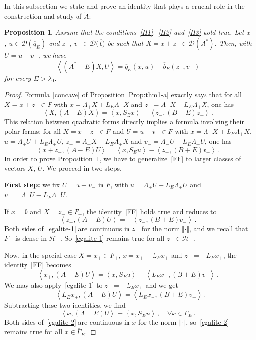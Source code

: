 \documentclass[12pt,reqno]{amsart}
\newtheorem{proposition}[theorem]{Proposition}
\newcommand{\innerproduct}[2]{\left\langle #1, #2 \right\rangle}
\newcommand{\be}[1]{\begin{equation}\label{#1}}
\newcommand{\ee}{\end{equation}}
\renewcommand{\(}{\left(}
\renewcommand{\)}{\right)}
\begin{document}
In this subsection we state and prove an identity that plays a crucial role in the construction and study of $\widetilde A$:
\begin{proposition}\label{Prop:formulaoperator}
Assume that the conditions~\eqref{H1},~\eqref{H2} and~\eqref{H3} hold true. Let $x$, $u\in \mathcal D(\overline{q}_E)$ and $z_-$, $v_-\in \mathcal D\big(\,\overline{b}\big)$ be such that $X=x+z_-\in \mathcal D\(A^*\)$. Then, with $U=u+v_-$, we have
\be{egalite-operator}
\innerproduct{(A^*-E)X}{U}= \overline q_E(x,u)-\overline b_E(z_-, v_-)
\ee
for every $E>\lambda_0$.
\end{proposition}
\begin{proof}
Formula~\eqref{concave} of Proposition \ref{Prop:thm1-a} exactly says that for all $X=x+z_-\in F$ with $x=\Lambda_+ X + L_E\Lambda_+ X$ and $z_-=\Lambda_-X-L_E\Lambda_+ X$, one has
$$\innerproduct{X}{(A-E)X}= \innerproduct{x}{S_E x}-\innerproduct{z_-}{(B+E)z_-}\,.$$
This relation between quadratic forms directly implies a formula involving their polar forms: for all $X=x+z_-\in F$ and $U=u+v_-\in F$ with $x=\Lambda_+ X + L_E\Lambda_+ X$, $u=\Lambda_+ U + L_E\Lambda_+ U$, $z_-=\Lambda_-X-L_E\Lambda_+ X$ and $v_-=\Lambda_-U-L_E\Lambda_+ U$, one has
\be{FF}\innerproduct{x+z_-}{(A-E)U}= \innerproduct{x}{S_E u}-\innerproduct{z_-}{(B+E)v_-}\,.\ee
In order to prove Proposition~\ref{Prop:formulaoperator}, we have to generalize~\eqref{FF} to larger classes of vectors $X,\,U$. We proceed in two steps.\medskip

\noindent
{\bf First step:} we fix $U=u+v_-$ in $F$, with $u=\Lambda_+ U + L_E\Lambda_+ U$ and $v_-=\Lambda_-U-L_E\Lambda_+ U$.\smallskip
 
\noindent
If $x=0$ and $X=z_-\in F_-$, the identity~\eqref{FF} holds true and reduces to
\be{egalite-1}
\innerproduct{z_-}{(A-E)U}= -\innerproduct{z_-}{(B+E)v_-}\,.
\ee
Both sides of~\eqref{egalite-1} are continuous in $z_-$ for the norm $\Vert \cdot\Vert$,
and we recall that $F_-$ is dense in $\mathcal H_-$. So~\eqref{egalite-1} remains true for all $z_-\in \mathcal H_-$.\smallskip

\noindent Now, in the special case $X=x_+\in F_+$, $x=x_++L_Ex_+$ and $z_-=-L_Ex_+$, the identity~\eqref{FF} becomes
\[ \innerproduct{x_+}{(A-E)U}= \innerproduct{x}{S_E u}+\innerproduct{L_Ex_+}{(B+E)v_-}\,.\]
We may also apply~\eqref{egalite-1} to $z_-=-L_E x_+$ and we get
\[ -\innerproduct{L_Ex_+}{(A-E)U}= \innerproduct{L_Ex_+}{(B+E)v_-}\,.\]
Subtracting these two identities, we find
\be{egalite-2}
\innerproduct{x}{(A-E)U}= \innerproduct{x}{S_E u}\,,\quad\forall x\in\Gamma_E\,.
\ee
Both sides of~\eqref{egalite-2} are continuous in $x$ for the norm $\Vert \cdot\Vert$, so~\eqref{egalite-2} remains true for all $x\in \overline{\Gamma}_E$.\smallskip


\end{proof}
\end{document}
